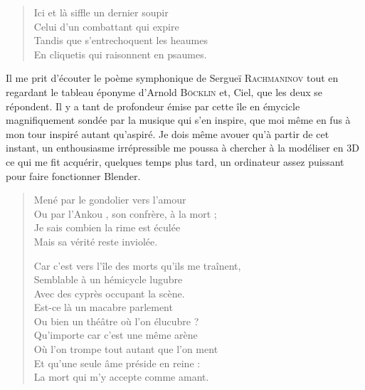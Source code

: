 \begin{verse}\quatrain
  Ici et là siffle un dernier soupir\\ 
  Celui d’un combattant qui expire\\ 
  Tandis que s’entrechoquent les heaumes\\ 
  En cliquetis qui raisonnent en psaumes.  %
\end{verse}

\begin{prose}
  Il me prit d’écouter le poème symphonique  de Sergueï \textsc{Rachmaninov} tout en regardant le tableau éponyme d’Arnold \textsc{Böcklin} et, Ciel, que les deux se répondent. Il y a tant de profondeur émise par cette île en émycicle magnifiquement sondée par la musique qui s’en inspire, que moi même en fus  à mon tour inspiré autant qu’aspiré. Je dois même avouer qu’à partir de cet instant, un enthousiasme  irrépressible me poussa à chercher à la modéliser en 3D ce qui me fit acquérir, quelques temps plus tard, un ordinateur assez puissant pour faire fonctionner Blender.
\end{prose}

\begin{verse}\quatrain\neuvain
  Mené par le gondolier vers l’amour\\ 
  Ou par l’Ankou%
  , son confrère, à la mort ;\\  %
Je sais combien la rime est éculée\\ 
  Mais sa vérité reste inviolée.  %

  Car c’est vers l’île des morts qu’ils me traînent,\\ 
  Semblable à un hémicycle lugubre\\ 
  Avec des cyprès occupant la scène.\\ 
  Est-ce là un macabre parlement\\ 
  Ou bien un théâtre où l’on élucubre ?\\ 
  Qu’importe car c’est une même arène\\ 
  Où l’on trompe tout autant que l’on ment\\ 
  Et qu’une seule âme préside en reine :\\ 
  La mort qui m’y accepte comme amant.  %
\end{verse}


